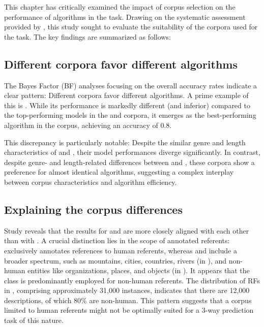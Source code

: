 This chapter has critically examined the impact of corpus selection on the performance of algorithms in the \context task. Drawing on the systematic assessment provided by \grec \citep{belz2010generating}, this study sought to evaluate the suitability of the corpora used for the \context task. The key findings are summarized as follows:

\subsection{Different corpora favor different algorithms} 
The Bayes Factor (BF) analyses focusing on the overall accuracy rates indicate a clear pattern: Different corpora favor different algorithms. A prime example of this is . While its performance is markedly different (and inferior) compared to the top-performing models in the \msrcor and \wsj corpora, it emerges as the best-performing algorithm in the \negcor corpus, achieving an accuracy of 0.8. 

This discrepancy is particularly notable: Despite the similar genre and length characteristics of \negcor and \msrcor, their model performances diverge significantly.
In contrast, despite genre- and length-related differences between \msrcor and \wsj, these corpora show a preference for almost identical algorithms, suggesting a complex interplay between corpus characteristics and algorithm efficiency.

\subsection{Explaining the corpus differences}
Study \studA reveals that the results for \msrcor and \wsj are more closely aligned with each other than with \negcor. A crucial distinction lies in the scope of annotated referents: \negcor exclusively annotates references to human referents, whereas \msrcor and \wsj include a broader spectrum, such as mountains, cities, countries, rivers (in \msrcor), and non-human entities like organizations, places, and objects (in \wsj). It appears that the class  is predominantly employed for non-human referents. The distribution of RFs in \wsj, comprising approximately 31,000 instances, indicates that there are 12,000 descriptions, of which 80\% are non-human. This pattern suggests that a corpus limited to human referents might not be optimally suited for a 3-way prediction task of this nature.

